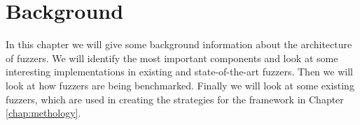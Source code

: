 
\chapter{Background}\label{chap:background} %





% 
In this chapter we will give some background information about the architecture of fuzzers. We will identify the most important components and look at some interesting implementations in existing and state-of-the-art fuzzers. Then we will look at how fuzzers are being benchmarked. Finally we will look at some existing fuzzers, which are used in creating the strategies for the framework in Chapter \ref{chap:methology}.


